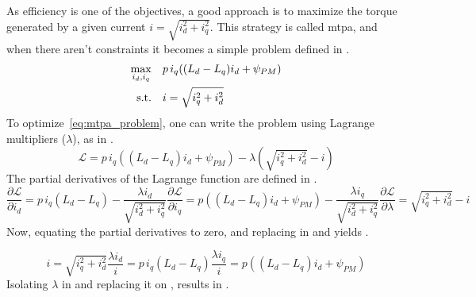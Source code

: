 As efficiency is one of the objectives, a good approach is to maximize the torque generated by a given current $i = \sqrt{i_d^2 + i_q^2}$. This strategy is called \gls{mtpa}, and when there aren't constraints it becomes a simple problem defined in .
\begin{equation}
	\begin{aligned}
		\max_{i_d,i_q} \quad & p\, i_q((L_d - L_q)i_d + \psi_{PM}) \\
		\rm{s.t.}  \quad & i = \sqrt{i_q^2 + i_d^2}            \\
	\end{aligned}
	\label{eq:mtpa_problem}
\end{equation}
To optimize~\ref{eq:mtpa_problem}, one can write the problem using Lagrange multipliers ($\lambda$), as in .
\begin{equation}
	\mathcal{L} = p\, i_q((L_d - L_q)i_d + \psi_{PM}) - \lambda(\sqrt{i_q^2 + i_d^2} - i)
	\label{eq:mtpa_lagrange}
\end{equation}
The partial derivatives of the Lagrange function are defined in .
\begin{subequations}
	\begin{equation}
		\frac{\partial \mathcal{L}}{\partial i_d}  = p\,i_q(L_d - L_q) - \frac{\lambda i_d}{\sqrt{i_d^2 + i_q^2}}
		\label{eq:lagrange_partial1}
	\end{equation}
	\begin{equation}
		\frac{\partial \mathcal{L}}{\partial i_q}  = p((L_d - L_q)i_d + \psi_{PM}) - \frac{\lambda i_q}{\sqrt{i_d^2 + i_q^2}}
		\label{eq:lagrange_partial2}
	\end{equation}
	\begin{equation}
		\frac{\partial \mathcal{L}}{\partial \lambda}  = \sqrt{i_q^2 + i_d^2} - i
		\label{eq:lagrange_partial3}
	\end{equation}
	\label{eq:mtpa_lagrange_partial}
\end{subequations}
Now, equating the partial derivatives to zero, and replacing  in  and  yields .

\begin{subequations}
	\begin{equation}
		i = \sqrt{i_q^2 + i_d^2}
		\label{eq:lagrange_partial21}
	\end{equation}
	\begin{equation}
		\frac{\lambda i_d}{i}  = p\,i_q(L_d - L_q)
		\label{eq:lagrange_partial22}
	\end{equation}
	\begin{equation}
		\frac{\lambda i_q}{i}  = p((L_d - L_q)i_d + \psi_{PM})
		\label{eq:lagrange_partial23}
	\end{equation}
	\label{eq:lagrange_partial20}
\end{subequations}
Isolating $\lambda$ in  and replacing it on  , results in .


